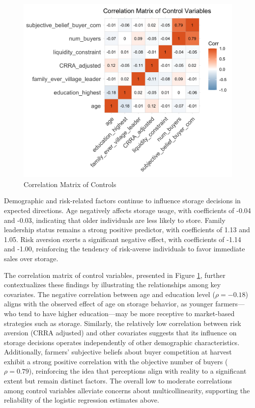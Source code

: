\documentclass[12pt]{article}
\begin{document}
\newpage
\begin{figure}[ht]
\centering
\includegraphics[width=1\textwidth]{figures/correlation_matrix_controls.png}
\caption{Correlation Matrix of Controls}
\label{Figure: Correlation Matrix of Controls}
\end{figure}

Demographic and risk-related factors continue to influence storage decisions in expected directions. Age negatively affects storage usage, with coefficients of -0.04 and -0.03, indicating that older individuals are less likely to store. Family leadership status remains a strong positive predictor, with coefficients of 1.13 and 1.05. Risk aversion exerts a significant negative effect, with coefficients of -1.14 and -1.00, reinforcing the tendency of risk-averse individuals to favor immediate sales over storage.  

The correlation matrix of control variables, presented in Figure \ref{Figure: Correlation Matrix of Controls}, further contextualizes these findings by illustrating the relationships among key covariates. The negative correlation between age and education level ($\rho = -0.18$) aligns with the observed effect of age on storage behavior, as younger farmers—who tend to have higher education—may be more receptive to market-based strategies such as storage. Similarly, the relatively low correlation between risk aversion (CRRA adjusted) and other covariates suggests that its influence on storage decisions operates independently of other demographic characteristics. Additionally, farmers’ subjective beliefs about buyer competition at harvest exhibit a strong positive correlation with the objective number of buyers ($\rho = 0.79$), reinforcing the idea that perceptions align with reality to a significant extent but remain distinct factors. The overall low to moderate correlations among control variables alleviate concerns about multicollinearity, supporting the reliability of the logistic regression estimates above. 
\end{document}

